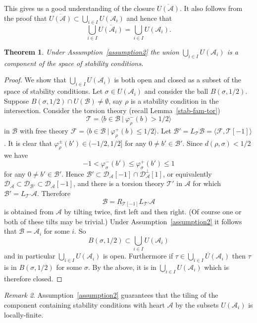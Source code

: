 \documentclass{article}
\theoremstyle{plain}
\newtheorem{theorem}{Theorem}[section] %
\theoremstyle{definition}
\theoremstyle{remark}
\newtheorem{remark}[theorem]{Remark}
\newcommand{\cat}[1]{\mathcal{#1}}
\begin{document}
This gives us a good understanding of the closure $\overline{U(\cat{A})}$. It also follows from the proof that $\overline{U(\cat{A})} \subset \bigcup_{i\in I} U(\cat{A}_i)$ and hence that
$$
\bigcup_{i\in I} \overline{U(\cat{A}_i)} = \bigcup_{i\in I} U(\cat{A}_i).
$$
\begin{theorem}
\label{component thm}
Under Assumption~\ref{assumption2} the union $\bigcup_{i\in I} U(\cat{A}_i)$ is a component of the space of stability conditions.
\end{theorem}
\begin{proof}
We show that $\bigcup_{i\in I} U(\cat{A}_i)$ is both open and closed as a subset of the space of stability conditions. Let $\sigma\in U(\cat{A}_i)$ and consider the ball $B(\sigma,1/2)$. Suppose $B(\sigma,1/2) \cap U(\cat{B})\neq \emptyset$, say $\rho$ is a stability condition in the intersection. Consider the torsion theory (recall Lemma~\ref{stab-fam-tor}) 
$$
\cat{T} = \langle b\in \cat{B} \ | \ \varphi_\rho^-(b) >  1/2\rangle
$$
in $\cat{B}$ with free theory $\cat{F} = \langle b\in \cat{B} \ | \ \varphi_\rho^+(b)\leq 1/2\rangle$. Let $\cat{B}'=L_\cat{T}\cat{B} = \langle \cat{F}, \cat{T}[-1]\rangle$. It is clear that  $\varphi^\pm_\rho(b')\in (-1/2,1/2]$ for any $0\neq b'\in \cat{B}'$. Since $d(\rho,\sigma)<1/2$ we have
$$
-1 < \varphi^-_\sigma(b') \leq \varphi^+_\sigma(b') \leq 1
$$
for any $0\neq b'\in\cat{B}'$. Hence $\cat{B}' \subset \cat{D}_\cat{A}[-1]\cap\cat{D}_\cat{A}^\perp[1]$, or equivalently $\cat{D}_\cat{A} \subset \cat{D}_{\cat{B}'} \subset \cat{D}_\cat{A}[-1]$, and there is a torsion theory $\cat{T}'$ in $\cat{A}$ for which $\cat{B}' = L_{\cat{T}'}\cat{A}$. Therefore
$$
\cat{B} = R_{\cat{T}[-1]}L_{\cat{T}'}\cat{A}
$$
is obtained from $\cat{A}$ by tilting twice, first left and then right. (Of course one or both of these tilts may be trivial.) Under Assumption~\ref{assumption2} it follows that $\cat{B}=\cat{A}_i$ for some $i$. So 
$$
B(\sigma,1/2) \subset \bigcup_{i\in I} U(\cat{A}_i)
$$
and in particular $\bigcup_{i\in I} U(\cat{A}_i)$ is open. Furthermore if $\tau \in \overline{\bigcup_{i\in I} U(\cat{A}_i) }$ then  $\tau$ is in $B(\sigma,1/2)$ for some $\sigma$. By the above, it is in $\bigcup_{i\in I} U(\cat{A}_i)$ which is therefore closed.
\end{proof}
\begin{remark}
Assumption~\ref{assumption2} guarantees that the tiling of the component containing stability conditions with heart $\cat{A}$ by the subsets $U(\cat{A}_i)$ is locally-finite.
\end{remark}
\end{document}
